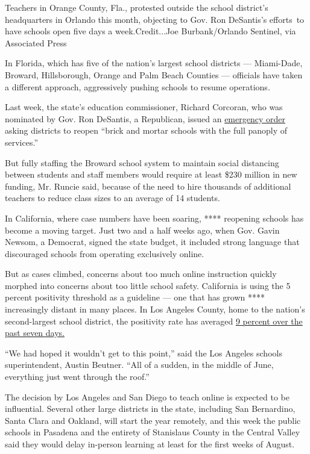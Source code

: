 Teachers in Orange County, Fla., protested outside the school district's
headquarters in Orlando this month, objecting to Gov. Ron DeSantis's
efforts~to have schools open five days a week.Credit...Joe
Burbank/Orlando Sentinel, via Associated Press

In Florida, which has five of the nation's largest school districts ---
Miami-Dade, Broward, Hillsborough, Orange and Palm Beach Counties ---
officials have taken a different approach, aggressively pushing schools
to resume operations.

Last week, the state's education commissioner, Richard Corcoran, who was
nominated by Gov. Ron DeSantis, a Republican, issued an
\href{http://www.fldoe.org/core/fileparse.php/19861/urlt/DOE-2020-EO-06.pdf}{emergency
order} asking districts to reopen ``brick and mortar schools with the
full panoply of services.''

But fully staffing the Broward school system to maintain social
distancing between students and staff members would require at least
\$230 million in new funding, Mr. Runcie said, because of the need to
hire thousands of additional teachers to reduce class sizes to an
average of 14 students.

In California, where case numbers have been soaring, **** reopening
schools has become a moving target. Just two and a half weeks ago, when
Gov. Gavin Newsom, a Democrat, signed the state budget, it included
strong language that discouraged schools from operating exclusively
online.

But as cases climbed, concerns about too much online instruction quickly
morphed into concerns about too little school safety. California is
using the 5 percent positivity threshold as a guideline --- one that has
grown **** increasingly distant in many places. In Los Angeles County,
home to the nation's second-largest school district, the positivity rate
has averaged
\href{http://publichealth.lacounty.gov/media/coronavirus/data/index.htm}{9
percent over the past seven days.}

``We had hoped it wouldn't get to this point,'' said the Los Angeles
schools superintendent, Austin Beutner. ``All of a sudden, in the middle
of June, everything just went through the roof.''

The decision by Los Angeles and San Diego to teach online is expected to
be influential. Several other large districts in the state, including
San Bernardino, Santa Clara and Oakland, will start the year remotely,
and this week the public schools in Pasadena and the entirety of
Stanislaus County in the Central Valley said they would delay in-person
learning at least for the first weeks of August.


